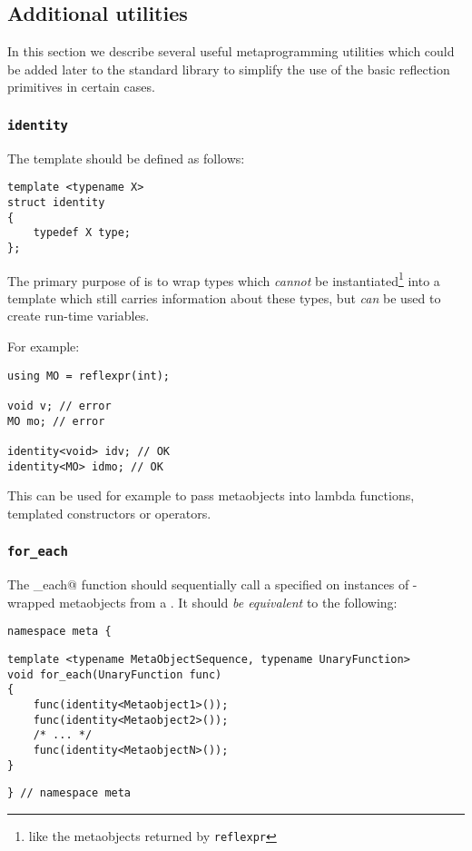\subsection{Additional utilities}
\label{fut-facade}

In this section we describe several useful metaprogramming utilities which
could be added later to the standard library to simplify the use of the basic
reflection primitives in certain cases.
 
\subsubsection{\texttt{identity}}

The \verb@identity@ template should be defined as follows:

\begin{verbatim}
template <typename X>
struct identity
{
	typedef X type;
};
\end{verbatim}

The primary purpose of \verb@identity@ is to wrap types which {\em cannot} be
instantiated\footnote{like the metaobjects returned by \texttt{reflexpr}}
into a template which still carries information about these types, but
{\em can} be used to create run-time variables.

For example:

\begin{verbatim}
using MO = reflexpr(int);

void v; // error
MO mo; // error

identity<void> idv; // OK
identity<MO> idmo; // OK
\end{verbatim}
 
This can be used for example to pass metaobjects into lambda functions,
templated constructors or operators. 

\subsubsection{\texttt{for\_each}}

The \verb@for_each@ function should sequentially call a specified
\verb@UnaryFunction@ on instances of \verb@identity@-wrapped metaobjects from
a . It should {\em be equivalent} to the following:

\begin{verbatim}
namespace meta {
\end{verbatim}
\begin{verbatim}
template <typename MetaObjectSequence, typename UnaryFunction>
void for_each(UnaryFunction func)
{
	func(identity<Metaobject1>());
	func(identity<Metaobject2>());
	/* ... */
	func(identity<MetaobjectN>());
}
\end{verbatim}
\begin{verbatim}
} // namespace meta
\end{verbatim}

